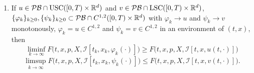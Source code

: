 \begin{proposition}
\begin{enumerate}[label=(\roman*)]
        \item If $u \in \mathcal{PB} \cap \operatorname{USC}([0,T) \times \mathbb{R}^d)$ and $v \in \mathcal{PB} \cap \operatorname{LSC}([0,T) \times \mathbb{R}^d)$, $\{\varphi_k\}_{k \geq 0}, \{\psi_k\}_{k \geq 0} \subset \mathcal{PB} \cap C^{1,2}([0,T) \times \mathbb{R}^d)$ with $\varphi_k \rightarrow u$ and $\psi_k \rightarrow v$ monotonously, $\varphi_k = u \in C^{1,2}$ and $\psi_k = v \in C^{1,2}$ in an environment of $(t,x)$, then
        \begin{equation}
            \liminf_{k \rightarrow \infty} F \big(t,x,p,X,\mathcal{I}[t_k,x_k,\varphi_k(\cdot)] \big) \geq F\big(t,x,p,X, \mathcal{I}[t,x,u(t,\cdot)] \big)
            \label{eqn: (33) in Seydel}
        \end{equation}
        \begin{equation}
            \limsup_{k \rightarrow \infty} F \big(t,x,p,X,\mathcal{I}[t_k,x_k,\psi_k(\cdot)]\big)\leq F\big( t,x,p,X,\mathcal{I}[t,x,v(t,\cdot)] \big).
            \label{eqn: (34) in Seydel}
        \end{equation}
    \end{enumerate}
\end{proposition}
